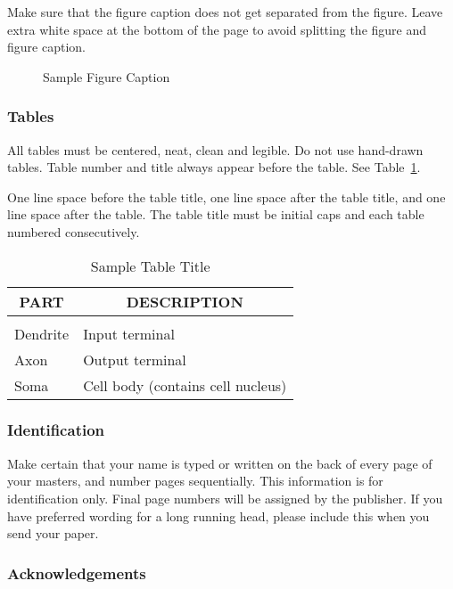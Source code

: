 Make sure that the figure caption does not get separated from the
figure. Leave extra white space at the bottom of the page to avoid
splitting the figure and figure caption.
\begin{figure}[h]
\vspace{1in}
\caption{Sample Figure Caption}
\end{figure}

\subsubsection{Tables}

All tables must be centered, neat, clean and legible. Do not use
hand-drawn tables. Table number and title always appear before the
table.
See Table~\ref{sample-table}.

One line space before the table title, one line space after the
table title, and one line space after the table. The table title
must be initial caps and each table numbered consecutively.

\begin{table}[t]
\caption{Sample Table Title}
\label{sample-table}
\begin{center}
\begin{tabular}{ll}
\multicolumn{1}{c}{\bf PART}  &\multicolumn{1}{c}{\bf DESCRIPTION}
\\ \hline \\
Dendrite         &Input terminal \\
Axon             &Output terminal \\
Soma             &Cell body (contains cell nucleus) \\
\end{tabular}
\end{center}
\end{table}

\subsubsection{Identification} 

Make certain that your name is typed or written on the back of
every page of your masters, and number pages sequentially. This
information is for identification only. Final page numbers will be
assigned by the publisher. If you have preferred wording for a long
running head, please include this when you send your paper. 

\subsubsection*{Acknowledgements}

